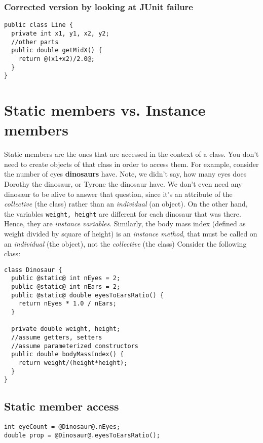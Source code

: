 \newpage

\subsubsection{Corrected version by looking at JUnit failure}
  \begin{lstlisting}[frame=single,style=correct]
public class Line {
  private int x1, y1, x2, y2;
  //other parts
  public double getMidX() {
    return @(x1+x2)/2.0@; 
  }
}
  \end{lstlisting}   

\section{Static members vs. Instance members}
Static members are the ones that are accessed in the context of a class. You don't need to create objects of that class in order to access them. For example, consider the number of eyes \textbf{dinosaurs} have. Note, we didn't say, how many eyes does Dorothy the dinosaur, or Tyrone the dinosaur have. 
\vskip 0.5cm
We don't even need any dinosaur to be alive to answer that question, since it's an attribute of the \emph{collective} (the class) rather than an \emph{individual} (an object).
\vskip 0.5cm
On the other hand, the variables \texttt{weight, height} are different for each dinosaur that was there. Hence, they are \emph{instance variables}. Similarly, the body mass index (defined as weight divided by square of height) is an \emph{instance method}, that must be called on an \emph{individual} (the object), not the \emph{collective} (the class)
\vskip 0.5cm
Consider the following class:

\begin{lstlisting}[style=buggy,basicstyle=\footnotesize]
class Dinosaur {
  public @static@ int nEyes = 2;
  public @static@ int nEars = 2;
  public @static@ double eyesToEarsRatio() {
	return nEyes * 1.0 / nEars;
  }
  
  private double weight, height;
  //assume getters, setters
  //assume parameterized constructors
  public double bodyMassIndex() {
    return weight/(height*height);
  }
}
\end{lstlisting}

\subsection{Static member access}

\begin{lstlisting}[style=buggy]
int eyeCount = @Dinosaur@.nEyes;
double prop = @Dinosaur@.eyesToEarsRatio();
\end{lstlisting} 

